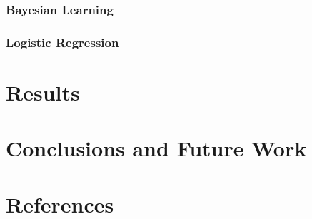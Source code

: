 \documentclass{article}
\begin{document}
\subsubsection{Bayesian Learning}

\subsubsection{Logistic Regression}


\section{Results}


\section{Conclusions and Future Work}


\section{References}
\end{document}
